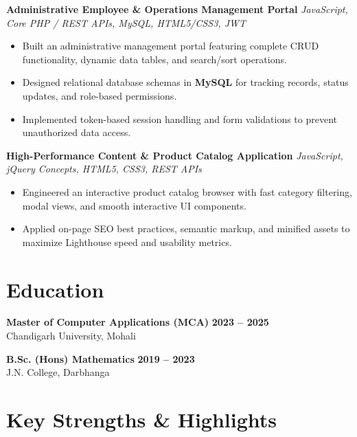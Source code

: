 \documentclass[a4paper,10pt]{article}
\begin{document}
\textbf{Administrative Employee \& Operations Management Portal}
\hfill
\textit{JavaScript, Core PHP / REST APIs, MySQL, HTML5/CSS3, JWT}

\begin{itemize}

    \item Built an administrative management portal featuring complete CRUD functionality, dynamic data tables, and search/sort operations.

    \item Designed relational database schemas in \textbf{MySQL} for tracking records, status updates, and role-based permissions.

    \item Implemented token-based session handling and form validations to prevent unauthorized data access.

\end{itemize}


\textbf{High-Performance Content \& Product Catalog Application}
\hfill
\textit{JavaScript, jQuery Concepts, HTML5, CSS3, REST APIs}

\begin{itemize}

    \item Engineered an interactive product catalog browser with fast category filtering, modal views, and smooth interactive UI components.

    \item Applied on-page SEO best practices, semantic markup, and minified assets to maximize Lighthouse speed and usability metrics.

\end{itemize}

\section*{Education}

\textbf{Master of Computer Applications (MCA)}
\hfill
\textbf{2023 -- 2025}
\\
Chandigarh University, Mohali

\vspace{3pt}

\textbf{B.Sc. (Hons) Mathematics}
\hfill
\textbf{2019 -- 2023}
\\
J.N. College, Darbhanga

\section*{Key Strengths \& Highlights}
\end{document}
